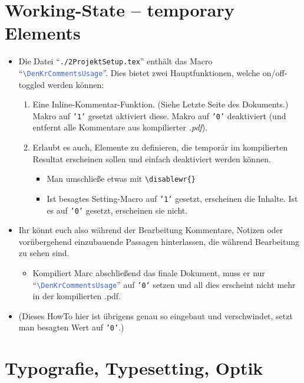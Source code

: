 \section*{Working-State -- temporary Elements}

\begin{itemize}
    \item Die Datei \enquote{\textcolor{PineGreen}{\texttt{./2ProjektSetup.tex}}} enthält das Macro \enquote{\textcolor{RoyalBlue}{\texttt{\textbackslash DenKrCommentsUsage}}}. Dies bietet zwei Hauptfunktionen, welche on/off-toggled werden können:
    \begin{enumerate}
        \item Eine Inline-Kommentar-Funktion. (Siehe Letzte Seite des Dokuments.) Makro auf \texttt{'1'} gesetzt aktiviert diese. Makro auf \texttt{'0'} deaktiviert (und entfernt alle Kommentare aus kompilierter \textit{.pdf}).
        \item Erlaubt es auch, Elemente zu definieren, die temporär im kompilierten Resultat erscheinen sollen und einfach deaktiviert werden können.
        \begin{itemize}
            \item Man umschließe etwas mit \texttt{\textcolor{Bittersweet}{\textbackslash disablewr}\{\}}
            \item Ist besagtes Setting-Macro auf \texttt{'1'} gesetzt, erscheinen die Inhalte. Ist es auf \texttt{'0'} gesetzt, erscheinen sie nicht.
        \end{itemize}
    \end{enumerate}
    \item[\labpragAsym] Ihr könnt euch also während der Bearbeitung Kommentare, Notizen oder vorübergehend einzubauende Passagen hinterlassen, die während Bearbeitung zu sehen sind.
    \begin{itemize}
        \item Kompiliert Marc abschließend das finale Dokument, muss er nur \enquote{\textcolor{RoyalBlue}{\texttt{\textbackslash DenKrCommentsUsage}}} auf \texttt{'0'} setzen und all dies erscheint nicht mehr in der kompilierten .pdf.
    \end{itemize}
    \item (Dieses HowTo hier ist übrigens genau so eingebaut und verschwindet, setzt man besagten Wert auf \texttt{'0'}.)
\end{itemize}




\section*{Typografie, Typesetting, Optik}

